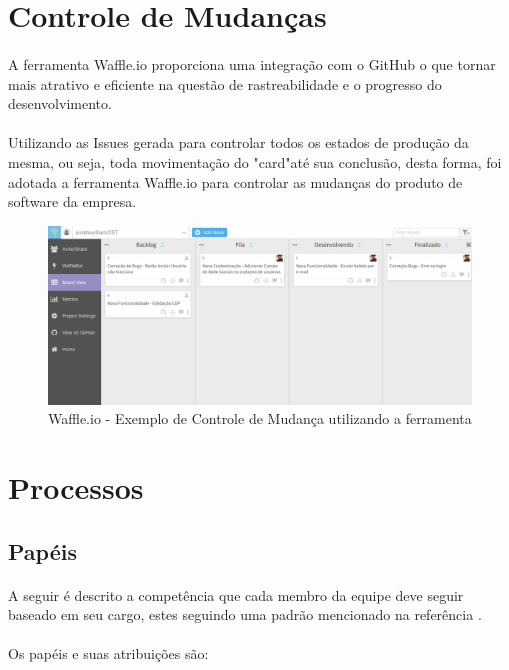 \documentclass[	DIV=calc,%
							paper=a4,%
							fontsize=12pt,%
							onecolumn]{scrartcl}	 					%
\begin{document}
\section{Controle de Mudanças}
\paragraph{}
A ferramenta Waffle.io proporciona uma integração com o GitHub o que tornar mais atrativo e eficiente na questão de rastreabilidade e o progresso do desenvolvimento. 
\paragraph{}
Utilizando as Issues gerada para controlar todos os estados de produção da mesma, ou seja, toda movimentação do "card"até sua conclusão, desta forma, foi adotada a ferramenta Waffle.io para controlar as mudanças do produto de software da empresa.

\begin{figure}[!h]
	\includegraphics[scale=0.36]{waffleio}
	\caption{Waffle.io - Exemplo de Controle de Mudança utilizando a ferramenta}
\end{figure}

\newpage
\section{Processos}

\subsection{Papéis}
\paragraph{}
A seguir é descrito a competência que cada membro da equipe deve seguir baseado em seu cargo, estes seguindo uma padrão mencionado na referência \cite{haumer2007eclipse}.
\paragraph{}
Os papéis e suas atribuições são:
\end{document}
